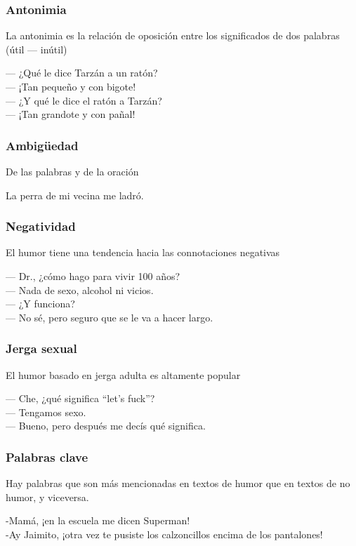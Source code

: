 \begin{frame}
\frametitle{Antonimia}
    La antonimia es la relación de oposición entre los significados de dos palabras (útil — inútil)
    \begin{example}
        — ¿Qué le dice Tarzán a un ratón?\\
        — ¡Tan pequeño y con bigote!\\
        — ¿Y qué le dice el ratón a Tarzán?\\
        — ¡Tan grandote y con pañal!\\
    \end{example}
\end{frame}

\begin{frame}
\frametitle{Ambigüedad}
    De las palabras y de la oración
    \begin{example}
        La perra de mi vecina me ladró.
    \end{example}
\end{frame}

\begin{frame}
\frametitle{Negatividad}
    El humor tiene una tendencia hacia las connotaciones negativas
    \begin{example}
        — Dr., ¿cómo hago para vivir 100 años?\\
        — Nada de sexo, alcohol ni vicios.\\
        — ¿Y funciona?\\
        — No sé, pero seguro que se le va a hacer largo.
    \end{example}
\end{frame}

\begin{frame}
\frametitle{Jerga sexual}
    El humor basado en jerga adulta es altamente popular
    \begin{example}
        — Che, ¿qué significa “let’s fuck”?\\
        — Tengamos sexo.\\
        — Bueno, pero después me decís qué significa.
    \end{example}
\end{frame}

\begin{frame}
\frametitle{Palabras clave}
    Hay palabras que son más mencionadas en textos de humor que en textos de no humor, y viceversa.
    \begin{example}
        -Mamá, ¡en la escuela me dicen Superman!\\
        -Ay Jaimito, ¡otra vez te pusiste los calzoncillos encima de los pantalones!
    \end{example}
\end{frame}


